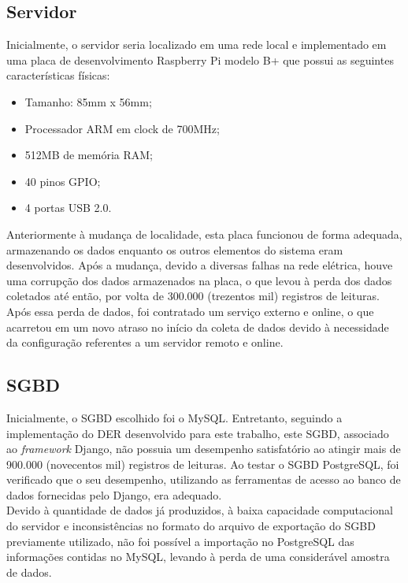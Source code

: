 \subsection{Servidor}
\quad Inicialmente, o servidor seria localizado em uma rede local e implementado em uma placa de desenvolvimento Raspberry Pi modelo B+ que possui as seguintes características físicas:
\begin{itemize}
  \item Tamanho: 85mm x 56mm;
  \item Processador ARM em clock de 700MHz;
  \item 512MB de memória RAM;
  \item 40 pinos GPIO;
  \item 4 portas USB 2.0.
\end{itemize}
\null\quad Anteriormente à mudança de localidade, esta placa funcionou de forma adequada, armazenando os dados enquanto os outros elementos do sistema eram desenvolvidos. Após a mudança, devido a diversas falhas na rede elétrica, houve uma corrupção dos dados armazenados na placa, o que levou à perda dos dados coletados até então, por volta de 300.000 (trezentos mil) registros de leituras. Após essa perda de dados, foi contratado um serviço externo e online, o que acarretou em um novo atraso no início da coleta de dados devido à necessidade da configuração referentes a um servidor remoto e online.

\subsection{\acrlong{SGBD}}
\quad Inicialmente, o \acrshort{SGBD} escolhido foi o MySQL. Entretanto, seguindo a implementação do \acrshort{DER} desenvolvido para este trabalho, este \acrlong{SGBD}, associado ao \textit{framework} Django, não possuia um desempenho satisfatório ao atingir mais de 900.000 (novecentos mil) registros de leituras. Ao testar o \acrshort{SGBD} PostgreSQL, foi verificado que o seu desempenho, utilizando as ferramentas de acesso ao banco de dados fornecidas pelo Django, era adequado.
\\\null \quad Devido à quantidade de dados já produzidos, à baixa capacidade computacional do servidor e  inconsistências no formato do arquivo de exportação do \acrshort{SGBD} previamente utilizado, não foi possível a importação no PostgreSQL das informações contidas no MySQL, levando à perda de uma considerável amostra de dados.
